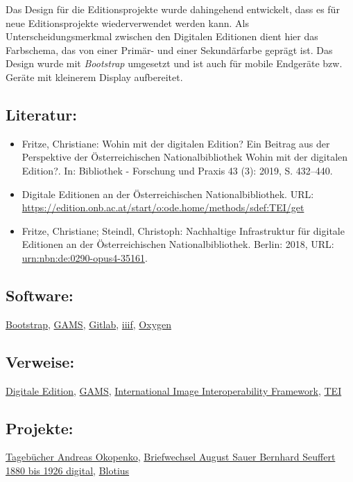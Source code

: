 \documentclass{article}
\begin{document}
        Das Design für die Editionsprojekte wurde dahingehend entwickelt, dass es für neue
                  Editionsprojekte wiederverwendet werden kann. Als Unterscheidungsmerkmal zwischen
                  den Digitalen Editionen dient hier das Farbschema, das von einer Primär- und einer
                  Sekundärfarbe geprägt ist. Das Design wurde mit \emph{Bootstrap}
                  umgesetzt und ist auch für mobile Endgeräte bzw. Geräte mit kleinerem Display
                  aufbereitet.\\
            
        \subsection*{Literatur:}\begin{itemize}\item Fritze, Christiane: Wohin mit der digitalen Edition? Ein Beitrag aus der
                              Perspektive der Österreichischen Nationalbibliothek Wohin mit der digitalen Edition?. In: Bibliothek - Forschung und Praxis 43 (3): 2019, S. 432–440.\item Digitale Editionen an der Österreichischen
                              Nationalbibliothek. URL: \url{https://edition.onb.ac.at/start/o:ode.home/methods/sdef:TEI/get}\item Fritze, Christiane; Steindl, Christoph: Nachhaltige Infrastruktur für digitale Editionen an der
                              Österreichischen Nationalbibliothek. Berlin: 2018, URL: \url{urn:nbn:de:0290-opus4-35161}.\end{itemize}\subsection*{Software:}\href{https://getbootstrap.com/}{Bootstrap}, \href{http://gams.uni-graz.at/archive/objects/o:gams.doku/methods/sdef:TEI/get?locale=de}{GAMS}, \href{http://gitlab.com/}{Gitlab}, \href{https://iiif.io/}{iiif}, \href{http://oxygenxml.com/}{Oxygen}\subsection*{Verweise:}\href{https://gams.uni-graz.at/o:konde.59}{Digitale Edition}, \href{https://gams.uni-graz.at/o:konde.70}{GAMS}, \href{https://gams.uni-graz.at/o:konde.123}{International Image
                           Interoperability Framework}, \href{https://gams.uni-graz.at/o:konde.178}{TEI}\subsection*{Projekte:}\href{https://edition.onb.ac.at/okopenko/context:okopenko/methods/sdef:Context/get}{Tagebücher Andreas Okopenko}, \href{https://edition.onb.ac.at/sauer-seuffert}{Briefwechsel August Sauer Bernhard Seuffert 1880 bis 1926 digital}, \href{https://edition.onb.ac.at/blotius}{Blotius
}
\end{document}
